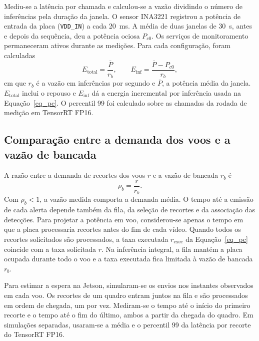 Mediu-se a latência por chamada e calculou-se a vazão dividindo o número de inferências pela duração da janela. O sensor INA3221 registrou a potência de entrada da placa (\texttt{VDD\_IN}) a cada 20~ms. A média de duas janelas de 30~s, antes e depois da sequência, deu a potência ociosa $P_{c0}$. Os serviços de monitoramento permaneceram ativos durante as medições. Para cada configuração, foram calculadas
\begin{equation}
  E_{\mathrm{total}}=\frac{\bar P}{r_b},
  \qquad
  E_{\mathrm{inf}}=\frac{\bar P-P_{c0}}{r_b},
  \label{eq_energia_bancada}
\end{equation}
em que $r_b$ é a vazão em inferências por segundo e $\bar P$, a potência média da janela. $E_{\mathrm{total}}$ inclui o repouso e $E_{\mathrm{inf}}$ dá a energia incremental por inferência usada na Equação~\eqref{eq_pc}. O percentil 99 foi calculado sobre as chamadas da rodada de medição em TensorRT FP16.

\subsection{Comparação entre a demanda dos voos e a vazão de bancada}

A razão entre a demanda de recortes dos voos $r$ e a vazão de bancada $r_b$ é
\begin{equation}
  \rho_b=\frac{r}{r_b}.
  \label{eq_demanda_bancada}
\end{equation}
Com $\rho_b<1$, a vazão medida comporta a demanda média. O tempo até a emissão de cada alerta depende também da fila, da seleção de recortes e da associação das detecções. Para projetar a potência em voo, considerou-se apenas o tempo em que a placa processaria recortes antes do fim de cada vídeo. Quando todos os recortes solicitados são processados, a taxa executada $r_{\mathrm{exec}}$ da Equação~\eqref{eq_pc} coincide com a taxa solicitada $r$. Na inferência integral, a fila mantém a placa ocupada durante todo o voo e a taxa executada fica limitada à vazão de bancada $r_b$.

Para estimar a espera na Jetson, simularam-se os envios nos instantes observados em cada voo. Os recortes de um quadro entram juntos na fila e são processados em ordem de chegada, um por vez. Mediram-se o tempo até o início do primeiro recorte e o tempo até o fim do último, ambos a partir da chegada do quadro. Em simulações separadas, usaram-se a média e o percentil 99 da latência por recorte do TensorRT FP16.
